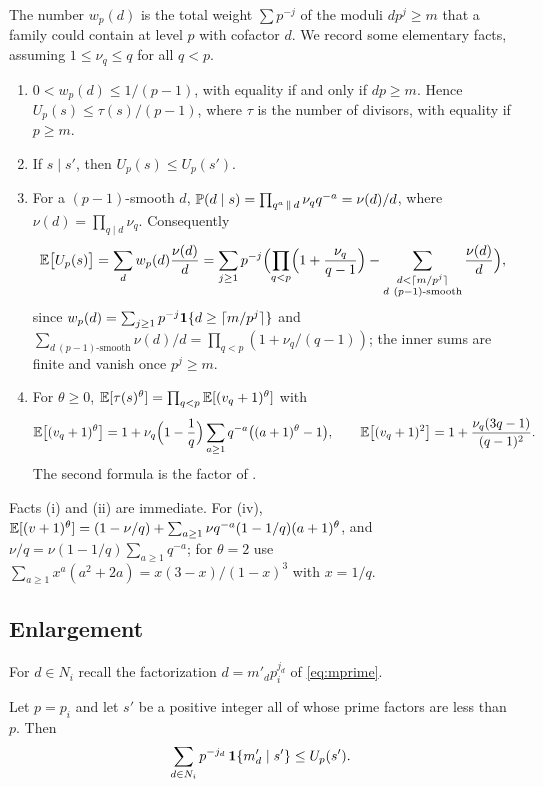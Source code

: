 The number $w_p(d)$ is the total weight $\sum p^{-j}$ of the moduli $dp^j\ge m$ that a family could contain at
level $p$ with cofactor $d$. We record some elementary facts, assuming $1\le\nu_q\le q$ for all $q<p$.
\begin{enumerate}[label=(\roman*)]
\item $0<w_p(d)\le1/(p-1)$, with equality if and only if $dp\ge m$. Hence $U_p(s)\le\tau(s)/(p-1)$, where $\tau$
  is the number of divisors, with equality if $p\ge m$.
\item If $s\mid s'$, then $U_p(s)\le U_p(s')$.
\item For a $(p-1)$-smooth $d$, $\P(d\mid s)=\prod_{q^a\,\|\,d}\nu_qq^{-a}=\nu(d)/d$, where
  $\nu(d)=\prod_{q\mid d}\nu_q$. Consequently
  \begin{equation}\label{eq:EU}
    \E\bigl[U_p(s)\bigr]=\sum_{d}w_p(d)\frac{\nu(d)}{d}
    =\sum_{j\ge1}p^{-j}\Bigl(\prod_{q<p}\Bigl(1+\frac{\nu_q}{q-1}\Bigr)
    -\sum_{\substack{d<\lceil m/p^j\rceil\\ d\ (p-1)\text{-smooth}}}\frac{\nu(d)}{d}\Bigr),
  \end{equation}
  since $w_p(d)=\sum_{j\ge1}p^{-j}\one\{d\ge\lceil m/p^j\rceil\}$ and
  $\sum_{d\ (p-1)\text{-smooth}}\nu(d)/d=\prod_{q<p}(1+\nu_q/(q-1))$; the inner sums are finite and vanish once
  $p^j\ge m$.
\item For $\theta\ge0$, $\E[\tau(s)^\theta]=\prod_{q<p}\E[(v_q+1)^\theta]$ with
  \begin{equation}\label{eq:Etheta}
    \E\bigl[(v_q+1)^\theta\bigr]=1+\nu_q\Bigl(1-\frac1q\Bigr)\sum_{a\ge1}q^{-a}\bigl((a+1)^\theta-1\bigr),
    \qquad
    \E\bigl[(v_q+1)^2\bigr]=1+\frac{\nu_q(3q-1)}{(q-1)^2}.
  \end{equation}
  The second formula is the factor of \cite[Lemma~3.7]{BBMST}.
\end{enumerate}
Facts (i) and (ii) are immediate. For (iv), $\E[(v+1)^\theta]=(1-\nu/q)+\sum_{a\ge1}\nu q^{-a}(1-1/q)(a+1)^\theta$,
and $\nu/q=\nu(1-1/q)\sum_{a\ge1}q^{-a}$; for $\theta=2$ use $\sum_{a\ge1}x^a(a^2+2a)=x(3-x)/(1-x)^3$ with
$x=1/q$.

\subsection{Enlargement}

For $d\in N_i$ recall the factorization $d=m'_dp_i^{j_d}$ of \eqref{eq:mprime}.

\begin{lemma}[enlargement]\label{lem:enlargement}
Let $p=p_i$ and let $s'$ be a positive integer all of whose prime factors are less than $p$. Then
\[
  \sum_{d\in N_i}p^{-j_d}\,\one\{m'_d\mid s'\}\le U_p(s').
\]
\end{lemma}

